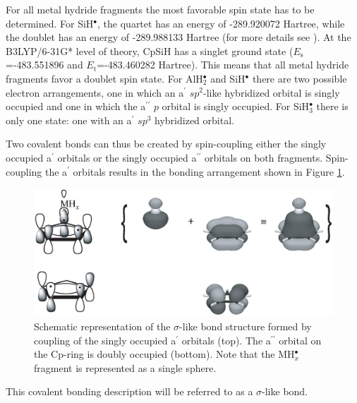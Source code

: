 For all metal hydride fragments the most favorable spin state has to be determined. For SiH$^\bullet$, the quartet has an energy of \mbox{-289.920072} Hartree, while the doublet has an energy of \mbox{-289.988133} Hartree (for more details see \cite{kalemos}). At the B3LYP/6-31G* level of theory, CpSiH has a singlet ground state ($E_\mathrm{s}$=\mbox{-483.551896} and $E_\mathrm{t}$=\mbox{-483.460282} Hartree). This means that all metal hydride fragments favor a doublet spin state. For AlH$_2^\bullet$ and SiH$^\bullet$ there are two possible electron arrangements, one in which an a$^\prime$ $sp^2$-like hybridized orbital is singly occupied and one in which the a$^{\prime\prime}$ $p$ orbital is singly occupied. For SiH$_3^\bullet$ there is only one state: one with an a$^\prime$ $sp^3$ hybridized orbital. 

Two covalent bonds can thus be created by spin-coupling either the singly occupied a$^\prime$ orbitals or the singly occupied a$^{\prime\prime}$ orbitals on both fragments. Spin-coupling the a$^\prime$ orbitals results in the bonding arrangement shown in Figure \ref{ch4.fig.sigma}.
\begin{figure}[htbp]
\center
\includegraphics[scale=0.45]{cyclopentadienyl/figures/sigma.eps}
\caption{Schematic representation of the $\sigma$-like bond structure formed by coupling of the singly occupied a$^\prime$ orbitals (top). The a$^{\prime\prime}$ orbital on the Cp-ring is doubly occupied (bottom). Note that the MH$_{x}^{\bullet}$ fragment is represented as a single sphere.}
\label{ch4.fig.sigma}
\end{figure}
This covalent bonding description will be referred to as a $\sigma$-like bond.


